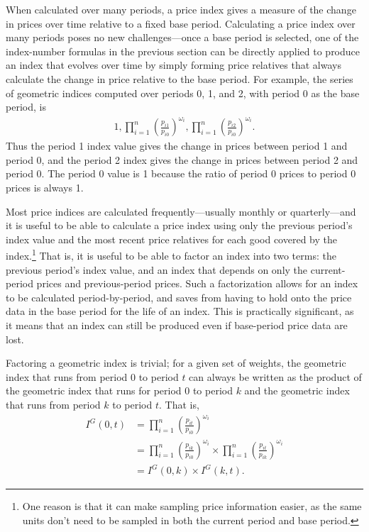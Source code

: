 \documentclass[]{article}
\begin{document}
When calculated over many periods, a price index gives a measure of the change in prices over time relative to a fixed base period. Calculating a price index over many periods poses no new challenges---once a base period is selected, one of the index-number formulas in the previous section can be directly applied to produce an index that evolves over time by simply forming price relatives that always calculate the change in price relative to the base period. For example, the series of geometric indices computed over periods 0, 1, and 2, with period 0 as the base period, is
\begin{align*}
1, \prod_{i = 1}^{n} \left(\frac{p_{i1}}{p_{i0}}\right)^{\omega_{i}}, \prod_{i = 1}^{n} \left(\frac{p_{i2}}{p_{i0}}\right)^{\omega_{i}}.
\end{align*}
Thus the period 1 index value gives the change in prices between period 1 and period 0, and the period 2 index gives the change in prices between period 2 and period 0. The period 0 value is 1 because the ratio of period 0 prices to period 0 prices is always 1.

Most price indices are calculated frequently---usually monthly or quarterly---and it is useful to be able to calculate a price index using only the previous period's index value and the most recent price relatives for each good covered by the index.\footnote{One reason is that it can make sampling price information easier, as the same units don't need to be sampled in both the current period and base period.} That is, it is useful to be able to factor an index into two terms: the previous period's index value, and an index that depends on only the current-period prices and previous-period prices. Such a factorization allows for an index to be calculated period-by-period, and saves from having to hold onto the price data in the base period for the life of an index. This is practically significant, as it means that an index can still be produced even if base-period price data are lost.

Factoring a geometric index is trivial; for a given set of weights, the geometric index that runs from period 0 to period \(t\) can always be written as the product of the geometric index that runs for period 0 to period \(k\) and the geometric index that runs from period \(k\) to period \(t\). That is,
\begin{align*}
I^{G}(0, t) &= \prod_{i = 1}^{n} \left(\frac{p_{it}}{p_{i0}}\right)^{\omega_i} \\
&= \prod_{i = 1}^{n} \left(\frac{p_{ik}}{p_{i0}}\right)^{\omega_i} \times \prod_{i = 1}^{n} \left(\frac{p_{it}}{p_{ik}}\right)^{\omega_i} \\
&= I^{G}(0, k) \times I^{G}(k, t).
\end{align*}
\end{document}
